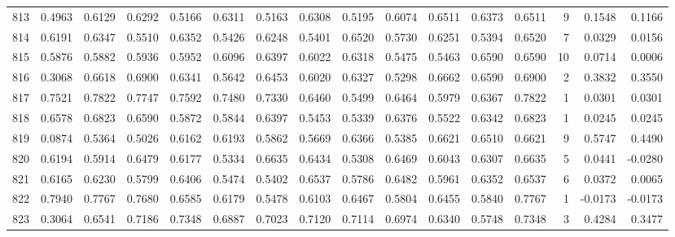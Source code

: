 \begin{tabular}{lrrrrrrrrrrrrrrr}
813 &      0.4963 &  0.6129 &  0.6292 &  0.5166 &  0.6311 &  0.5163 &  0.6308 &  0.5195 &  0.6074 &  0.6511 &   0.6373 &     0.6511 &      9 &                    0.1548 &                     0.1166 \\
814 &      0.6191 &  0.6347 &  0.5510 &  0.6352 &  0.5426 &  0.6248 &  0.5401 &  0.6520 &  0.5730 &  0.6251 &   0.5394 &     0.6520 &      7 &                    0.0329 &                     0.0156 \\
815 &      0.5876 &  0.5882 &  0.5936 &  0.5952 &  0.6096 &  0.6397 &  0.6022 &  0.6318 &  0.5475 &  0.5463 &   0.6590 &     0.6590 &     10 &                    0.0714 &                     0.0006 \\
816 &      0.3068 &  0.6618 &  0.6900 &  0.6341 &  0.5642 &  0.6453 &  0.6020 &  0.6327 &  0.5298 &  0.6662 &   0.6590 &     0.6900 &      2 &                    0.3832 &                     0.3550 \\
817 &      0.7521 &  0.7822 &  0.7747 &  0.7592 &  0.7480 &  0.7330 &  0.6460 &  0.5499 &  0.6464 &  0.5979 &   0.6367 &     0.7822 &      1 &                    0.0301 &                     0.0301 \\
818 &      0.6578 &  0.6823 &  0.6590 &  0.5872 &  0.5844 &  0.6397 &  0.5453 &  0.5339 &  0.6376 &  0.5522 &   0.6342 &     0.6823 &      1 &                    0.0245 &                     0.0245 \\
819 &      0.0874 &  0.5364 &  0.5026 &  0.6162 &  0.6193 &  0.5862 &  0.5669 &  0.6366 &  0.5385 &  0.6621 &   0.6510 &     0.6621 &      9 &                    0.5747 &                     0.4490 \\
820 &      0.6194 &  0.5914 &  0.6479 &  0.6177 &  0.5334 &  0.6635 &  0.6434 &  0.5308 &  0.6469 &  0.6043 &   0.6307 &     0.6635 &      5 &                    0.0441 &                    -0.0280 \\
821 &      0.6165 &  0.6230 &  0.5799 &  0.6406 &  0.5474 &  0.5402 &  0.6537 &  0.5786 &  0.6482 &  0.5961 &   0.6352 &     0.6537 &      6 &                    0.0372 &                     0.0065 \\
822 &      0.7940 &  0.7767 &  0.7680 &  0.6585 &  0.6179 &  0.5478 &  0.6103 &  0.6467 &  0.5804 &  0.6455 &   0.5840 &     0.7767 &      1 &                   -0.0173 &                    -0.0173 \\
823 &      0.3064 &  0.6541 &  0.7186 &  0.7348 &  0.6887 &  0.7023 &  0.7120 &  0.7114 &  0.6974 &  0.6340 &   0.5748 &     0.7348 &      3 &                    0.4284 &                     0.3477 \\

\end{tabular}
